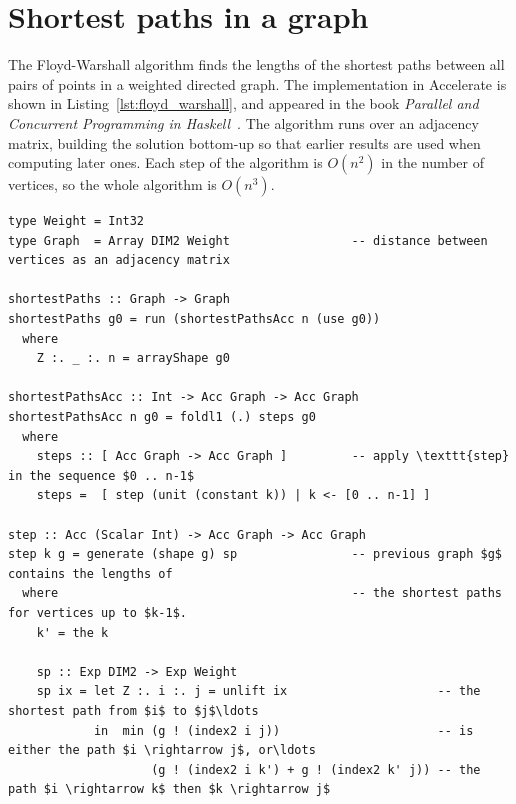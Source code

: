 \section{Shortest paths in a graph}
\label{sec:floyd_warshall}

The Floyd-Warshall algorithm finds the lengths of the shortest paths between all
pairs of points in a weighted directed graph. The implementation in Accelerate
is shown in Listing~\ref{lst:floyd_warshall}, and appeared in the book
\emph{Parallel and Concurrent Programming in Haskell}~\cite{Marlow:2013wn}. The
algorithm runs over an adjacency matrix, building the solution bottom-up so that
earlier results are used when computing later ones. Each step of the algorithm
is $O\left(n^2\right)$ in the number of vertices, so the whole algorithm is
$O\left(n^3\right)$.

\begin{lstlisting}[style=haskell_float
    ,label=lst:floyd_warshall
    ,caption={[Floyd-Warshall shortest-paths algorithm]
        Floyd-Warshall shortest-paths algorithm~\cite{Marlow:2013wn}}]
type Weight = Int32
type Graph  = Array DIM2 Weight                 -- distance between vertices as an adjacency matrix

shortestPaths :: Graph -> Graph
shortestPaths g0 = run (shortestPathsAcc n (use g0))
  where
    Z :. _ :. n = arrayShape g0

shortestPathsAcc :: Int -> Acc Graph -> Acc Graph
shortestPathsAcc n g0 = foldl1 (.) steps g0
  where
    steps :: [ Acc Graph -> Acc Graph ]         -- apply \texttt{step} in the sequence $0 .. n-1$
    steps =  [ step (unit (constant k)) | k <- [0 .. n-1] ]

step :: Acc (Scalar Int) -> Acc Graph -> Acc Graph
step k g = generate (shape g) sp                -- previous graph $g$ contains the lengths of
  where                                         -- the shortest paths for vertices up to $k-1$.
    k' = the k

    sp :: Exp DIM2 -> Exp Weight
    sp ix = let Z :. i :. j = unlift ix                     -- the shortest path from $i$ to $j$\ldots
            in  min (g ! (index2 i j))                      -- is either the path $i \rightarrow j$, or\ldots
                    (g ! (index2 i k') + g ! (index2 k' j)) -- the path $i \rightarrow k$ then $k \rightarrow j$
\end{lstlisting}

